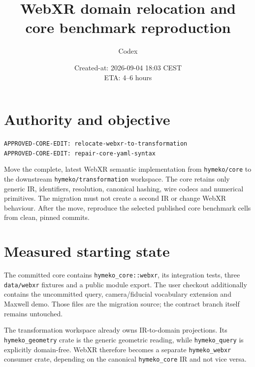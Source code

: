 \documentclass[11pt]{article}
\title{WebXR domain relocation and core benchmark reproduction}
\author{Codex}
\date{Created-at: 2026-09-04 18:03 CEST\\ETA: 4--6 hours}
\begin{document}
\maketitle

\section{Authority and objective}
\texttt{APPROVED-CORE-EDIT: relocate-webxr-to-transformation}\\
\texttt{APPROVED-CORE-EDIT: repair-core-yaml-syntax}

Move the complete, latest WebXR semantic implementation from
\texttt{hymeko/core} to the downstream \texttt{hymeko/transformation}
workspace.  The core retains only generic IR, identifiers, resolution,
canonical hashing, wire codecs and numerical primitives.  The migration must
not create a second IR or change WebXR behaviour.  After the move, reproduce
the selected published core benchmark cells from clean, pinned commits.

\section{Measured starting state}
The committed core contains \texttt{hymeko\_core::webxr}, its integration
tests, three \texttt{data/webxr} fixtures and a public module export.  The user
checkout additionally contains the uncommitted query, camera/fiducial
vocabulary extension and Maxwell demo.  Those files are the migration source;
the contract branch itself remains untouched.

The transformation workspace already owns IR-to-domain projections.  Its
\texttt{hymeko\_geometry} crate is the generic geometric reading, while
\texttt{hymeko\_query} is explicitly domain-free.  WebXR therefore becomes a
separate \texttt{hymeko\_webxr} consumer crate, depending on the canonical
\texttt{hymeko\_core} IR and not vice versa.
\end{document}
